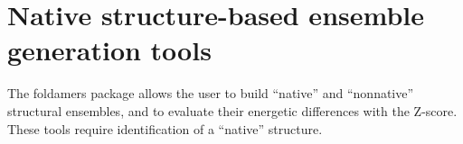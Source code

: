 \documentclass[letterpaper,12pt,english,openany,oneside]{sphinxmanual}
\begin{document}
\section{Native structure-based ensemble generation tools}
\label{\detokenize{ensembles:native-structure-based-ensemble-generation-tools}}
The foldamers package allows the user to build “native” and “nonnative” structural ensembles, and to evaluate their energetic differences with the Z-score.  These tools require identification of a “native” structure.

\label{\detokenize{ensembles:module-ensembles.ens_build}}
\end{document}

